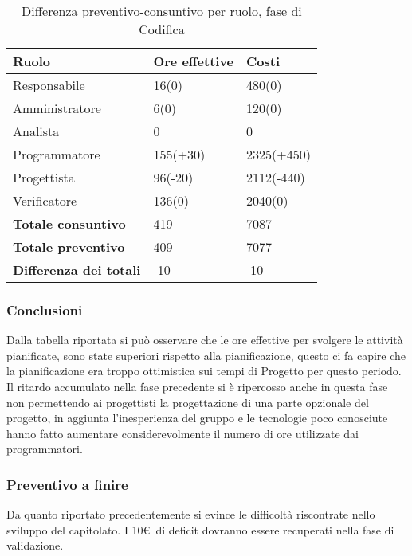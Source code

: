 	\begin{table}[H]
		\centering
	  \begin{tabular}{p{}p{}
		    							p{}}
		   \toprule Ruolo & Ore effettive & Costi \\
		   \midrule
		   Responsabile & 16(0) & 480(0) \\
		   Amministratore & 6(0) & 120(0) \\
		   Analista & 0 & 0 \\
		   Programmatore & 155(+30) & 2325(+450) \\
		   Progettista & 96(-20) & 2112(-440) \\
		   Verificatore & 136(0) & 2040(0) \\
		   \hline
		   \textbf{Totale consuntivo} & 419 & 7087 \\
		   \textbf{Totale preventivo} & 409 & 7077 \\
		   \textbf{Differenza dei totali} & -10 & -10 \\
		   \bottomrule
	 \end{tabular}
	 	\label{tab:costuntivoCodifica}
	 	\caption{Differenza preventivo-consuntivo per ruolo, fase di Codifica}
	\end{table}

\subsubsection{Conclusioni}

Dalla tabella riportata si può osservare che le ore effettive per svolgere le attività pianificate, sono state superiori rispetto alla pianificazione, questo ci fa capire che la pianificazione era troppo ottimistica sui tempi di Progetto per questo periodo.
Il ritardo accumulato nella fase precedente si è ripercosso anche in questa fase non permettendo ai progettisti la progettazione di una parte opzionale del progetto, in aggiunta l'inesperienza del gruppo e le tecnologie poco conosciute hanno fatto aumentare considerevolmente il numero di ore utilizzate dai programmatori.

\subsubsection{Preventivo a finire}{
	Da quanto riportato precedentemente si evince le difficoltà riscontrate nello sviluppo del capitolato. I 10\euro\ di deficit dovranno essere recuperati nella fase di validazione.
}




